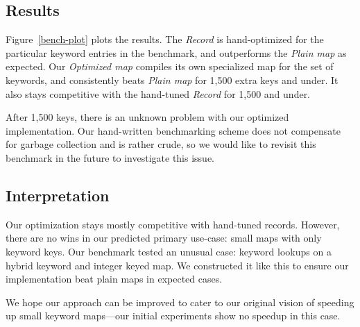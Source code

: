 \documentclass[preprint]{sigplanconf}
\begin{document}
\subsection{Results}

Figure~\ref{bench-plot} plots the results.
The \emph{Record} is hand-optimized for the particular
keyword entries in the benchmark, and outperforms
the \emph{Plain map} as expected.
Our \emph{Optimized map} compiles its own specialized
map for the set of keywords, and consistently
beats \emph{Plain map} for 1,500 extra keys and under.
It also stays competitive with the hand-tuned \emph{Record}
for 1,500 and under.

After 1,500 keys, there is an unknown problem with our optimized
implementation. Our hand-written benchmarking scheme
does not compensate for garbage collection and is rather crude,
so we would like to revisit this benchmark in the future to 
investigate this issue.

\subsection{Interpretation}

Our optimization stays mostly competitive with hand-tuned
records. However, there are no wins in our predicted
primary use-case: small maps with only keyword keys.
Our benchmark tested an unusual case: keyword lookups on a
hybrid keyword and integer keyed map.
We constructed it like this to ensure our implementation beat
plain maps in expected cases.

We hope our approach can be improved to cater to our
original vision of speeding up small keyword maps---our
initial experiments show no speedup in this case.

\end{document}
